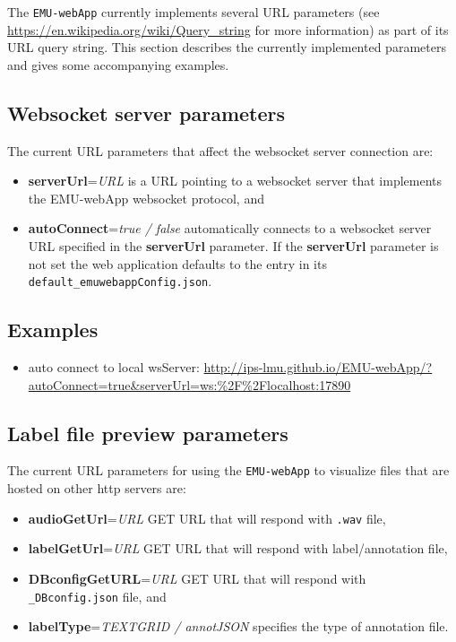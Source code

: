 \documentclass[
]{book}
\providecommand{\tightlist}{%
  \setlength{\itemsep}{0pt}\setlength{\parskip}{0pt}}
\begin{document}
The \texttt{EMU-webApp} currently implements several URL parameters (see \url{https://en.wikipedia.org/wiki/Query_string} for more information) as part of its URL query string. This section describes the currently implemented parameters and gives some accompanying examples.

\hypertarget{websocket-server-parameters}{%
\subsection{Websocket server parameters}\label{websocket-server-parameters}}

The current URL parameters that affect the websocket server connection are:

\begin{itemize}
\tightlist
\item
  \textbf{serverUrl}=\emph{URL} is a URL pointing to a websocket server that implements the EMU-webApp websocket protocol, and
\item
  \textbf{autoConnect}=\emph{true / false} automatically connects to a websocket server URL specified in the \textbf{serverUrl} parameter. If the \textbf{serverUrl} parameter is not set the web application defaults to the entry in its \texttt{default\_emuwebappConfig.json}.
\end{itemize}

\hypertarget{examples}{%
\subsection{Examples}\label{examples}}

\begin{itemize}
\tightlist
\item
  auto connect to local wsServer: \url{http://ips-lmu.github.io/EMU-webApp/?autoConnect=true\&serverUrl=ws:\%2F\%2Flocalhost:17890}
\end{itemize}

\hypertarget{label-file-preview-parameters}{%
\subsection{Label file preview parameters}\label{label-file-preview-parameters}}

The current URL parameters for using the \texttt{EMU-webApp} to visualize files that are hosted on other http servers are:

\begin{itemize}
\tightlist
\item
  \textbf{audioGetUrl}=\emph{URL} GET URL that will respond with \texttt{.wav} file,
\item
  \textbf{labelGetUrl}=\emph{URL} GET URL that will respond with label/annotation file,
\item
  \textbf{DBconfigGetURL}=\emph{URL} GET URL that will respond with \texttt{\_DBconfig.json} file, and
\item
  \textbf{labelType}=\emph{TEXTGRID / annotJSON} specifies the type of annotation file.
\end{itemize}
\end{document}
